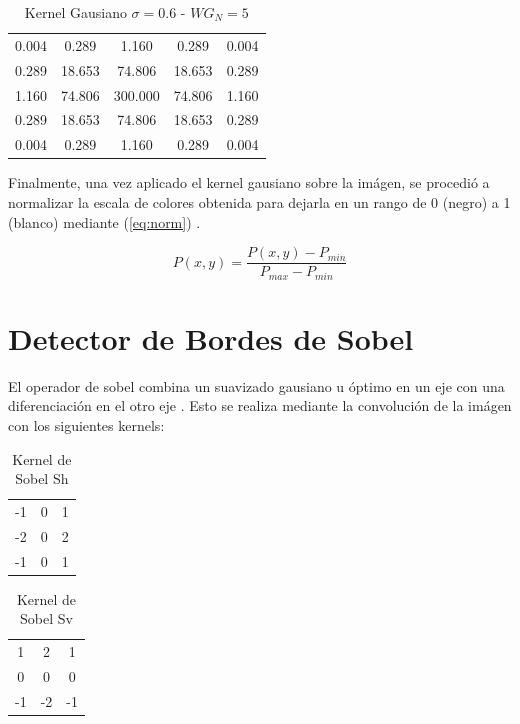 \documentclass{IEEEtran}
\begin{document}
\begin{table}[H]
\centering
\begin{tabular}{|*5c|}
\hline
 0.004& 0.289& 1.160& 0.289& 0.004\\
 0.289& 18.653& 74.806& 18.653& 0.289\\
 1.160& 74.806& 300.000& 74.806& 1.160\\
 0.289& 18.653& 74.806& 18.653& 0.289\\
 0.004& 0.289& 1.160& 0.289& 0.004\\
\hline
\end{tabular}
\caption{Kernel Gausiano $\sigma = 0.6$ - $WG_{N}=5$}
\label{tb:gaus06}
\end{table}

Finalmente, una vez aplicado el kernel gausiano sobre la imágen, se procedió a 
normalizar la escala de colores obtenida para dejarla en un rango de 0 (negro) 
a 1 (blanco)
mediante (\ref{eq:norm}) \cite{nixon2008feature}.

\begin{equation}
P(x,y) = \frac{P(x,y) - P_{min}}{P_{max} - P_{min}}
\label{eq:norm}
\end{equation} 

\section{Detector de Bordes de Sobel}
El operador de sobel combina un suavizado gausiano u óptimo 
en un eje con una diferenciación en el otro eje \cite{nixon2008feature}.
Esto se realiza mediante la convolución de la imágen con los siguientes
kernels:

\begin{table}[H]
\centering
\begin{tabular}{|*3c|}
\hline
-1 & 0 & 1 \\
-2 & 0 & 2 \\
-1 & 0 & 1 \\
\hline
\end{tabular}
\caption{Kernel de Sobel Sh}
\label{tb:sh}
\end{table}

\begin{table}[H]
\centering
\begin{tabular}{|*3c|}
\hline
1 & 2 & 1 \\
0 & 0 & 0 \\
-1 & -2 & -1 \\
\hline
\end{tabular}
\caption{Kernel de Sobel Sv}
\label{tb:sv}
\end{table}
\end{document}
